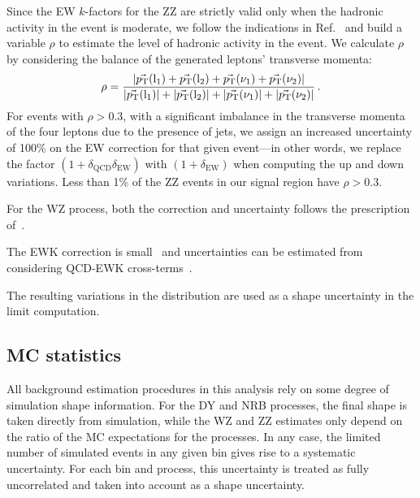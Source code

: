 Since the EW $k$-factors for the ZZ are strictly valid only when the hadronic
activity in the event is moderate, we follow the
indications in Ref.~\cite{Gieseke:2014gka} and build a variable $\rho$
to estimate the level of hadronic activity in the event.
We calculate $\rho$ by considering the balance of the generated leptons' transverse momenta: 
\begin{equation}
\rho = \frac{\left|\vec{p_{\mathrm{T}}}(\mathrm{l}_1)+\vec{p_{\mathrm{T}}}(\mathrm{l}_2)+\vec{p_{\mathrm{T}}}(\nu_1)+\vec{p_{\mathrm{T}}}(\nu_2)\right|}{\left|\vec{p_{\mathrm{T}}}(\mathrm{l}_1)\right|+\left|\vec{p_{\mathrm{T}}}(\mathrm{l}_2)\right|+\left|\vec{p_{\mathrm{T}}}(\nu_1)\right|+\left|\vec{p_{\mathrm{T}}}(\nu_2)\right|}\,. 
\end{equation} 
For events with $\rho>0.3$, \ie with a significant imbalance in the
transverse momenta of the four leptons due to the presence of jets,
 we assign an increased uncertainty of 100\% on the EW correction for that given
event---in other words, we replace the factor 
$(1+\delta_{\mathrm{QCD}}\delta_{\mathrm{EW}})$ with 
$(1+\delta_{\mathrm{EW}})$ when computing the up and down
variations. Less than 1\% of the ZZ events in our signal region have
$\rho>0.3$.

For the WZ process, both the correction and uncertainty follows the prescription of~\cite{HZZ2l2v2018}.

The EWK correction is small~\cite{Bierweiler:2013dja,Gieseke:2014gka,Baglio:113005}
and uncertainties can be estimated from considering QCD-EWK cross-terms~\cite{Manohar:2016nzj,Alwall:2014hca,Frixione:2014qaa,Frixione:2015zaa}.

The resulting variations in the \ETm distribution are used as a shape uncertainty in 
the limit computation.

\subsection{MC statistics}

All background estimation procedures in this analysis rely on some degree
of simulation shape information.
For the DY and NRB processes, the final shape is taken directly from simulation, 
while the WZ and ZZ estimates only depend on the ratio of the MC expectations for the processes.
In any case, the limited number of simulated events in any given bin gives rise to a systematic uncertainty.
For each bin and process, this uncertainty is treated as fully uncorrelated and taken into account as a shape uncertainty.

